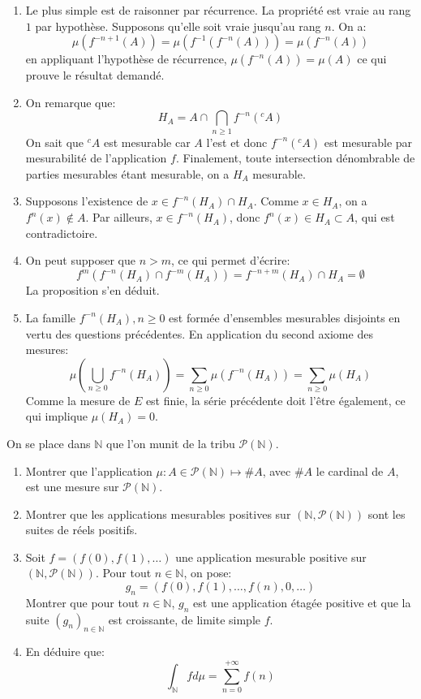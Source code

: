 \documentclass[a4paper, 12pt]{amsart}
\begin{document}
\begin{enumerate}
 \item Le plus simple est de raisonner par récurrence. La propriété est vraie
au rang $1$ par hypothèse. Supposons qu'elle soit vraie jusqu'au rang $n$. On a:
\[
 \mu\left(f^{-n+1}(A)\right) = \mu\left(f^{-1}\left(f^{-n}(A) \right) \right) =
\mu\left(f^{-n}(A)\right)
\]
en appliquant l'hypothèse de récurrence, $\mu\left(f^{-n}(A)\right)=\mu(A)$ ce
qui prouve le résultat demandé.
\item On remarque que:
\[
 H_A = A \cap \bigcap_{n \geq 1} f^{-n}\left({}^cA\right)
\]
On sait que ${}^cA$ est mesurable car $A$ l'est et donc 
$f^{-n}\left({}^cA\right)$ est mesurable par mesurabilité de l'application $f$.
Finalement, toute intersection dénombrable de parties mesurables étant
mesurable, on a $H_A$ mesurable.
\item Supposons l'existence de $x \in f^{-n}(H_A) \cap H_A$. Comme $x \in H_A$,
on a $f^{n}(x) \notin A$. Par ailleurs, $x \in f^{-n}(H_A)$, donc $f^{n}(x)\in
H_A \subset A$, qui est contradictoire.
\item On peut supposer que $n > m$, ce qui permet d'écrire:
\[
 f^{m}\left(f^{-n}(H_A) \cap f^{-m}(H_A)\right)= f^{-n+m}(H_A) \cap H_A =
\emptyset 
\]
La proposition s'en déduit.
\item La famille $f^{-n}\left(H_A\right), n\geq 0$ est formée d'ensembles
mesurables disjoints en vertu des questions précédentes. En application du
second axiome des mesures:
\[
 \mu \left( \bigcup_{n \geq 0} f^{-n}(H_A) \right) = \sum_{n \geq 0}
\mu\left(f^{-n}(H_A)\right) = \sum_{n \geq 0}
\mu\left(H_A\right)
\]
Comme la mesure de $E$ est finie, la série précédente doit l'être également, ce
qui implique $\mu\left(H_A\right) =0$.
\end{enumerate}
\begin{fex}
 On se place dans $\mathbb{N}$ que l'on munit de la tribu
$\mathcal{P}(\mathbb{N})$. 
\begin{enumerate}
  \item Montrer que l'application $\mu \colon A \in \mathcal{P}(\mathbb{N})
  \mapsto \#A$, avec $\#A$ le cardinal de $A$, est une mesure sur
  $\mathcal{P}(\mathbb{N})$.
  \item Montrer que les applications mesurables positives sur
  $\left(\mathbb{N},\mathcal{P}(\mathbb{N})\right)$ sont les suites de réels
  positifs.
  \item Soit $f=\left(f(0),f(1),\dots\right)$ une application mesurable positive
  sur $\left(\mathbb{N},\mathcal{P}(\mathbb{N})\right)$. Pour tout $n \in
  \mathbb{N}$, on pose:
  \[
  g_n = \left(f(0),f(1),\dots,f(n), 0, \dots \right)
  \]
  Montrer que pour tout $n \in \mathbb{N}$, $g_n$ est une application étagée
  positive et que la suite $(g_n)_{n \in \mathbb{N}}$ est croissante, de limite
  simple $f$.
  \item En déduire que:
  \[
  \int_{\mathbb{N}} f d \mu = \sum_{n=0}^{+\infty} f(n)
  \]
\end{enumerate}
\end{fex}
\end{document}
